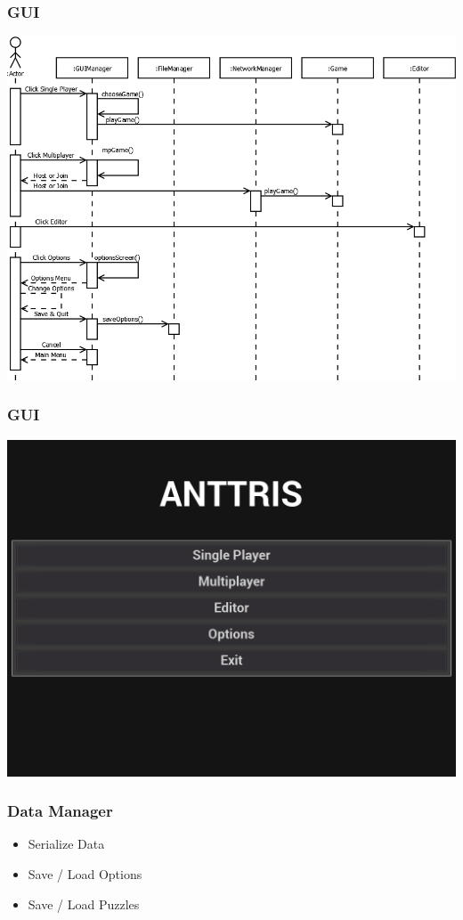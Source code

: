 \documentclass{beamer}
\begin{document}
\begin{frame}
    \frametitle{GUI} %
    \includegraphics[width=1\linewidth]{Anttris_GUISequence.png}
\end{frame}

\begin{frame}
    \frametitle{GUI} %
    \includegraphics[width=1\linewidth]{Anttris_MainMenu.png}
\end{frame}

\begin{frame}
    \frametitle{Data Manager} %
    \begin{itemize}
	\item Serialize Data
	\pause \item Save / Load Options
	\pause \item Save / Load Puzzles
	\end{itemize}
\end{frame}
\end{document}
